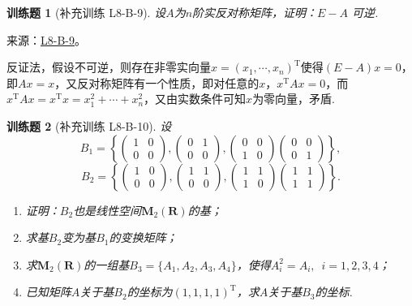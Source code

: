\documentclass[UTF8,12pt,a4paper,fontset=fandol]{ctexart}
\newtheorem{exercise}{训练题}[section]
\begin{document}
\begin{exercise}[补充训练 L8-B-9]\label{prob:L8-B-9}
设$A$为$n$阶实反对称矩阵，证明：$E-A$ 可逆.
\end{exercise}
\noindent 来源：\href{https://github.com/yhwu-is/Linear-Algebra-Left-Undone/blob/new/%E8%AE%B2%E4%B9%89/%E4%B8%93%E9%A2%98/8%20%E7%9B%B8%E6%8A%B5%E6%A0%87%E5%87%86%E5%BD%A2.tex}{L8-B-9}。
\begin{solve}
反证法，假设不可逆，则存在非零实向量$x=(x_1,\cdots,x_n)^\mathrm{T}$使得$(E-A)x=0$，即$Ax=x$，又反对称矩阵有一个性质，即对任意的$x$，$x^\mathrm{T}Ax=0$，而$x^\mathrm{T}Ax=x^\mathrm{T}x=x_1^2+\cdots+x_n^2$，又由实数条件可知$x$为零向量，矛盾.
\end{solve}

\begin{exercise}[补充训练 L8-B-10]\label{prob:L8-B-10}
设
        \[B_1=\left\{\begin{pmatrix}
                1 & 0 \\ 0 & 0
            \end{pmatrix},\begin{pmatrix}
                0 & 1 \\ 0 & 0
            \end{pmatrix},\begin{pmatrix}
                0 & 0 \\ 1 & 0
            \end{pmatrix}\begin{pmatrix}
                0 & 0 \\ 0 & 1
            \end{pmatrix}\right\},\]
        \[B_2=\left\{\begin{pmatrix}
                1 & 0 \\ 0 & 0
            \end{pmatrix},\begin{pmatrix}
                1 & 1 \\ 0 & 0
            \end{pmatrix},\begin{pmatrix}
                1 & 1 \\ 1 & 0
            \end{pmatrix}\begin{pmatrix}
                1 & 1 \\ 1 & 1
            \end{pmatrix}\right\}.\]
        \begin{enumerate}
            \item 证明：$B_2$也是线性空间$\mathbf{M}_2(\mathbf{R})$的基；

            \item 求基$B_2$变为基$B_1$的变换矩阵；

            \item 求$\mathbf{M}_2(\mathbf{R})$的一组基$B_3=\{A_1,A_2,A_3,A_4\}$，使得$A_i^2=A_i,\enspace i=1,2,3,4$；

            \item 已知矩阵$A$关于基$B_2$的坐标为$(1,1,1,1)^\mathrm{T}$，求$A$关于基$B_3$的坐标.
        \end{enumerate}
\end{exercise}
\end{document}
